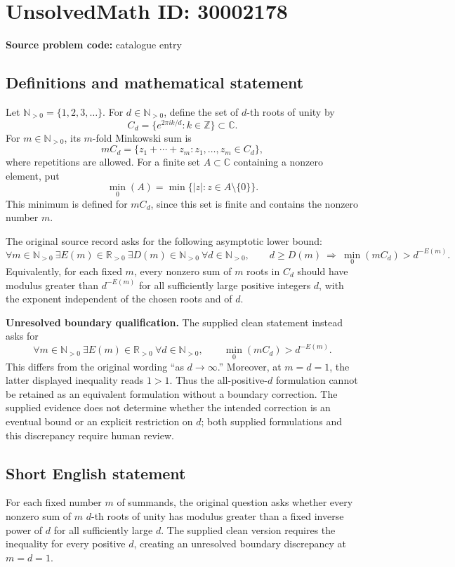 \documentclass[11pt]{article}
\newcommand{\N}{\mathbb{N}}
\newcommand{\Z}{\mathbb{Z}}
\newcommand{\R}{\mathbb{R}}
\newcommand{\C}{\mathbb{C}}
\begin{document}
\section*{UnsolvedMath ID: 30002178}
\textbf{Source problem code:} catalogue entry
\subsection{Definitions and mathematical statement}
Let \(\N_{>0}=\{1,2,3,\ldots\}\). For \(d\in\N_{>0}\), define the set of \(d\)-th roots of unity by
\[
C_d=\{e^{2\pi i k/d}:k\in\Z\}\subset\C.
\]
For \(m\in\N_{>0}\), its \(m\)-fold Minkowski sum is
\[
mC_d=\{z_1+\cdots+z_m:z_1,\ldots,z_m\in C_d\},
\]
where repetitions are allowed. For a finite set \(A\subset\C\) containing a nonzero element, put
\[
\min_0(A)=\min\{|z|:z\in A\setminus\{0\}\}.
\]
This minimum is defined for \(mC_d\), since this set is finite and contains the nonzero number \(m\).

The original source record asks for the following asymptotic lower bound:
\[
\forall m\in\N_{>0}\ \exists E(m)\in\R_{>0}\ \exists D(m)\in\N_{>0}\ \forall d\in\N_{>0},\qquad
 d\ge D(m)\ \Longrightarrow\ \min_0(mC_d)>d^{-E(m)}.
\]
Equivalently, for each fixed \(m\), every nonzero sum of \(m\) roots in \(C_d\) should have modulus greater than \(d^{-E(m)}\) for all sufficiently large positive integers \(d\), with the exponent independent of the chosen roots and of \(d\).

\textbf{Unresolved boundary qualification.} The supplied clean statement instead asks for
\[
\forall m\in\N_{>0}\ \exists E(m)\in\R_{>0}\ \forall d\in\N_{>0},\qquad
\min_0(mC_d)>d^{-E(m)}.
\]
This differs from the original wording ``as \(d\to\infty\).'' Moreover, at \(m=d=1\), the latter displayed inequality reads \(1>1\). Thus the all-positive-\(d\) formulation cannot be retained as an equivalent formulation without a boundary correction. The supplied evidence does not determine whether the intended correction is an eventual bound or an explicit restriction on \(d\); both supplied formulations and this discrepancy require human review.
\subsection{Short English statement}
For each fixed number \(m\) of summands, the original question asks whether every nonzero sum of \(m\) \(d\)-th roots of unity has modulus greater than a fixed inverse power of \(d\) for all sufficiently large \(d\). The supplied clean version requires the inequality for every positive \(d\), creating an unresolved boundary discrepancy at \(m=d=1\).
\end{document}
